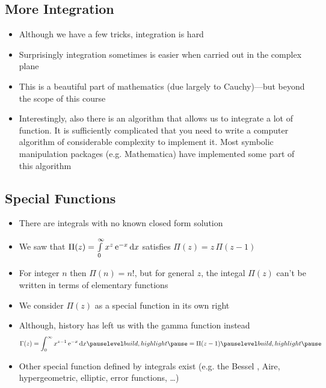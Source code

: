 \begin{slide}
\section[-1]{More Integration}

\begin{PauseHighLight}
  \begin{itemize}
  \item Although we have a few tricks, integration is hard\pause
  \item Surprisingly integration sometimes is easier when carried out
    in the complex plane\pause
  \item This is a beautiful part of mathematics\pause{} (due largely
    to Cauchy)\pauseb---but beyond the scope of this course\pauseb
  \item Interestingly, also there is an algorithm that allows us to
    integrate a lot of function\pause. It is sufficiently complicated
    that you need to write a computer algorithm of considerable
    complexity to implement it\pauseb.  Most symbolic manipulation
    packages (e.g. Mathematica) have implemented some part of this
    algorithm\pauseb
  \end{itemize}
\end{PauseHighLight}

\end{slide}


\begin{slide}
\section[-2]{Special Functions}

\begin{PauseHighLight}
  \begin{itemize}
  \item There are integrals with no known closed form solution\pause
  \item We saw that $\Pi(z) = \int\limits_0^\infty x^z\, {\rm e}^{-x} \, \mathrm{d} x$
    satisfies $\Pi(z) = z\,\Pi(z-1)$\pause
  \item For integer $n$ then $\Pi(n) = n!$\pause, but for general $z$,
    the integal $\Pi(z)$ can't be written in terms of elementary
    functions\pause
  \item We consider $\Pi(z)$ as a special function in its own
    right\pause
  \item Although, history has left us with the gamma function instead
    \begin{align*}
      \Gamma(z) = \int_0^\infty x^{z-1}\, \e{-x} \, \dd x\pauseb = \Pi(z-1)\pauseb
    \end{align*}
  \item Other special function defined by integrals exist (e.g. the
    Bessel , Aire, hypergeometric, elliptic, error functions, \ldots)\pauseb
  \end{itemize}
\end{PauseHighLight}

\end{slide}

